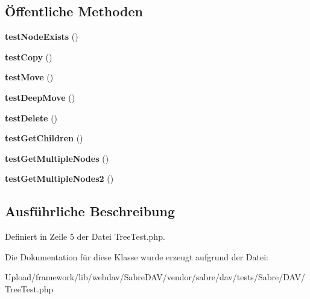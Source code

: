 \subsection*{Öffentliche Methoden}
\begin{DoxyCompactItemize}
\item 
\mbox{\label{class_sabre_1_1_d_a_v_1_1_tree_test_a2e0549b9af70276a12e4f6f514437149}} 
{\bfseries test\+Node\+Exists} ()
\item 
\mbox{\label{class_sabre_1_1_d_a_v_1_1_tree_test_a3c9f1126559bb09588e299590d0badb5}} 
{\bfseries test\+Copy} ()
\item 
\mbox{\label{class_sabre_1_1_d_a_v_1_1_tree_test_a1b9b3f580f7eb43d3d02dd47f707a0a9}} 
{\bfseries test\+Move} ()
\item 
\mbox{\label{class_sabre_1_1_d_a_v_1_1_tree_test_ab665e79cc1e24aae72cc3952f626ed51}} 
{\bfseries test\+Deep\+Move} ()
\item 
\mbox{\label{class_sabre_1_1_d_a_v_1_1_tree_test_a58d482a14c62df7e4da44c5408bae7ac}} 
{\bfseries test\+Delete} ()
\item 
\mbox{\label{class_sabre_1_1_d_a_v_1_1_tree_test_aae8dd5e420aaaa6caddc707b51ff0c31}} 
{\bfseries test\+Get\+Children} ()
\item 
\mbox{\label{class_sabre_1_1_d_a_v_1_1_tree_test_a815bd34e0e35b5e16cab249da1c9e636}} 
{\bfseries test\+Get\+Multiple\+Nodes} ()
\item 
\mbox{\label{class_sabre_1_1_d_a_v_1_1_tree_test_ac742aaa30796fd37097298131c784441}} 
{\bfseries test\+Get\+Multiple\+Nodes2} ()
\end{DoxyCompactItemize}


\subsection{Ausführliche Beschreibung}


Definiert in Zeile 5 der Datei Tree\+Test.\+php.



Die Dokumentation für diese Klasse wurde erzeugt aufgrund der Datei\+:\begin{DoxyCompactItemize}
\item 
Upload/framework/lib/webdav/\+Sabre\+D\+A\+V/vendor/sabre/dav/tests/\+Sabre/\+D\+A\+V/Tree\+Test.\+php\end{DoxyCompactItemize}
